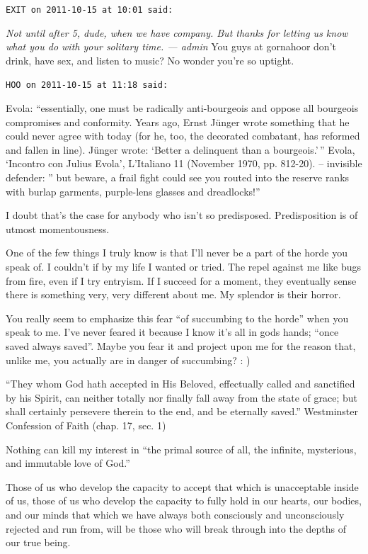 \begin{footnotesize}
\begin{sffamily}
\hfill

\texttt{EXIT on 2011-10-15 at 10:01 said:} 

\emph{Not until after 5, dude, when we have company. But thanks for letting us know what you do with your solitary time. --- admin} You guys at gornahoor don't drink, have sex, and listen to music? No wonder you're so uptight.

\hfill

\texttt{HOO on 2011-10-15 at 11:18 said:} 

Evola: ``essentially, one must be radically anti-bourgeois and oppose all bourgeois compromises and conformity. Years ago, Ernst Jünger wrote something that he could never agree with today (for he, too, the decorated combatant, has reformed and fallen in line). Jünger wrote: `Better a delinquent than a bourgeois.'\,'' Evola, `Incontro con Julius Evola', L'Italiano 11 (November 1970, pp. 812-20). -- invisible defender: '' but beware, a frail fight could see you routed into the reserve ranks with burlap garments, purple-lens glasses and dreadlocks!''

I doubt that's the case for anybody who isn't so predisposed. Predisposition is of utmost momentousness.

One of the few things I truly know is that I'll never be a part of the horde you speak of. I couldn't if by my life I wanted or tried. The repel against me like bugs from fire, even if I try entryism. If I succeed for a moment, they eventually sense there is something very, very different about me. My splendor is their horror.

You really seem to emphasize this fear ``of succumbing to the horde'' when you speak to me. I've never feared it because I know it's all in gods hands; ``once saved always saved''. Maybe you fear it and project upon me for the reason that, unlike me, you actually are in danger of succumbing? : )

``They whom God hath accepted in His Beloved, effectually called and sanctified by his Spirit, can neither totally nor finally fall away from the state of grace; but shall certainly persevere therein to the end, and be eternally saved.'' Westminster Confession of Faith (chap. 17, sec. 1) 

Nothing can kill my interest in ``the primal source of all, the infinite, mysterious, and immutable love of God.''

Those of us who develop the capacity to accept that which is unacceptable inside of us, those of us who develop the capacity to fully hold in our hearts, our bodies, and our minds that which we have always both consciously and unconsciously rejected and run from, will be those who will break through into the depths of our true being.


\end{sffamily}
\end{footnotesize}
